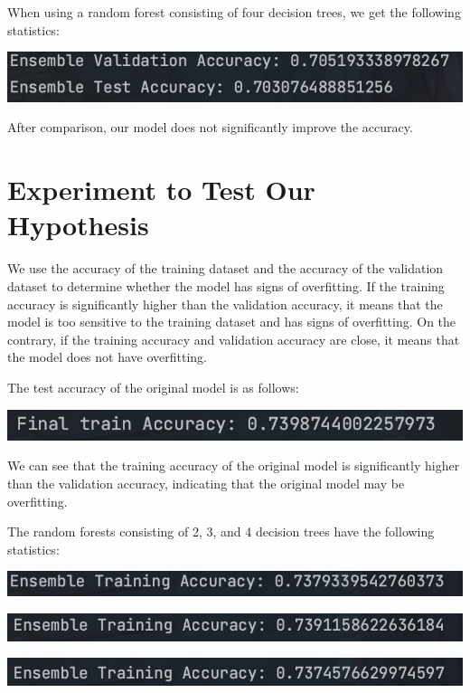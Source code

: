 \documentclass{article}
\begin{document}
When using a random forest consisting of four decision trees, we get the following statistics:

\includegraphics[width=0.7\linewidth]{6121723196137_.pic.jpg}
    
After comparison, our model does not significantly improve the accuracy.

\section*{Experiment to Test Our Hypothesis}

We use the accuracy of the training dataset and the accuracy of the validation dataset to determine whether the model has signs of overfitting. If the training accuracy is significantly higher than the validation accuracy, it means that the model is too sensitive to the training dataset and has signs of overfitting. On the contrary, if the training accuracy and validation accuracy are close, it means that the model does not have overfitting.

The test accuracy of the original model is as follows:

\includegraphics[width=0.7\linewidth]{6071723195572_.pic.jpg}

We can see that the training accuracy of the original model is significantly higher than the validation accuracy, indicating that the original model may be overfitting.

The random forests consisting of 2, 3, and 4 decision trees have the following statistics:

\includegraphics[width=0.7\linewidth]{6091723195756_.pic.jpg}

\includegraphics[width=0.7\linewidth]{6111723195885_.pic.jpg}

\includegraphics[width=0.7\linewidth]{6131723196143_.pic.jpg}
\end{document}
